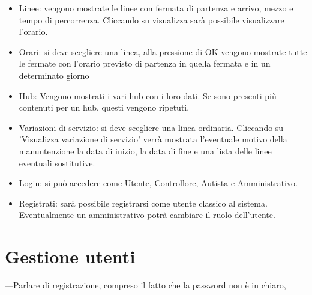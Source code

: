 \documentclass[12pt,a4paper]{report}
\begin{document}
\begin{itemize}
    \item Linee: vengono mostrate le linee  con fermata di partenza e arrivo, mezzo e tempo di percorrenza. Cliccando su visualizza sarà possibile visualizzare l'orario.
    \item Orari: si deve scegliere una linea, alla pressione di OK vengono mostrate tutte le fermate con l'orario previsto di partenza in quella fermata e in un determinato giorno
    \item Hub: Vengono mostrati i vari hub con i loro dati. Se sono presenti più contenuti per un hub, questi vengono ripetuti.
    \item Variazioni di servizio: si deve scegliere una linea ordinaria. Cliccando su 'Visualizza variazione di servizio' verrà mostrata l'eventuale motivo della manuntenzione la data di inizio, la data di fine e una lista delle linee eventuali sostitutive.
    \item Login: si può accedere come Utente, Controllore, Autista e Amministrativo.
    \item Registrati: sarà possibile registrarsi come utente classico al sistema. Eventualmente un amministrativo potrà cambiare il ruolo dell'utente.
\end{itemize}


\section{Gestione utenti}
---Parlare di registrazione, compreso il fatto che la password non è  in chiaro,
\end{document}
